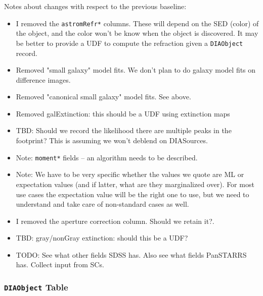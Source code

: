 \documentclass[12pt]{article}
\newcommand{\code}[1]{\texttt{#1}}
\newcommand{\DIAObject}{\code{DIAObject}\xspace}
\begin{document}
Notes about changes with respect to the previous baseline:
\begin{itemize}
\item I removed the \texttt{astromRefr*} columns. These will depend on the SED (color) of the object, and the color won't be know when the object is discovered. It may be better to provide a UDF to compute the refraction given a \DIAObject record.
\item Removed "small galaxy" model fits. We don't plan to do galaxy model fits on difference images.
\item Removed "canonical small galaxy" model fits. See above.
\item Removed galExtinction: this should be a UDF using extinction maps
\item TBD: Should we record the likelihood there are multiple peaks in the footprint? This is assuming we won't deblend on DIASources.
\item Note: \texttt{moment*} fields -- an algorithm needs to be described.
\item Note: We have to be very specific whether the values we quote are ML or expectation values (and if latter, what are they marginalized over). For most use cases the expectation value will be the right one to use, but we need to understand and take care of non-standard cases as well.
\item I removed the aperture correction column. Should we retain it?.
\item TBD: gray/nonGray extinction: should this be a UDF?
\item TODO: See what other fields SDSS has. Also see what fields PanSTARRS has. Collect input from SCs.
\end{itemize}

\subsubsection{\DIAObject Table}
\end{document}
